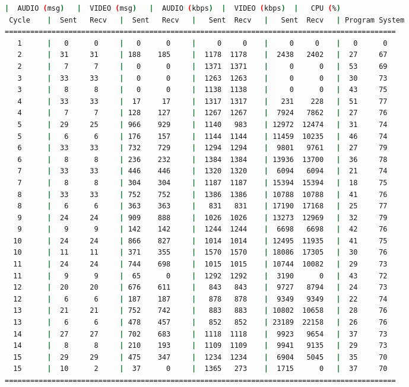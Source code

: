\begin{adjustbox}{max width=\textwidth}
\begin{lstlisting}[language=bash,basicstyle=\ttfamily\scriptsize]
          |  AUDIO (msg)   |  VIDEO (msg)   |  AUDIO (kbps)  |  VIDEO (kbps)  |   CPU (%)
 Cycle    |  Sent   Recv   |  Sent   Recv   |   Sent  Recv   |   Sent  Recv   | Program System
============================================================================================
   1      |   0      0     |   0      0     |     0     0    |     0     0    |   0      0
   2      |  31     31     | 188    185     |  1178  1178    |  2438   2402   |  27     67
   2      |   7      7     |   0      0     |  1371  1371    |     0      0   |  53     69
   3      |  33     33     |   0      0     |  1263  1263    |     0      0   |  30     73
   3      |   8      8     |   0      0     |  1138  1138    |     0      0   |  43     75
   4      |  33     33     |  17     17     |  1317  1317    |   231    228   |  51     77
   4      |   7      7     | 128    127     |  1267  1267    |  7924   7862   |  27     76
   5      |  29     25     | 966    929     |  1140   983    | 12972  12474   |  31     74
   5      |   6      6     | 176    157     |  1144  1144    | 11459  10235   |  46     74
   6      |  33     33     | 732    729     |  1294  1294    |  9801   9761   |  27     79
   6      |   8      8     | 236    232     |  1384  1384    | 13936  13700   |  36     78
   7      |  33     33     | 446    446     |  1320  1320    |  6094   6094   |  21     74
   7      |   8      8     | 304    304     |  1187  1187    | 15394  15394   |  18     75
   8      |  33     33     | 752    752     |  1386  1386    | 10788  10788   |  41     76
   8      |   6      6     | 363    363     |   831   831    | 17190  17168   |  25     77
   9      |  24     24     | 909    888     |  1026  1026    | 13273  12969   |  32     79
   9      |   9      9     | 142    142     |  1244  1244    |  6698   6698   |  42     76
  10      |  24     24     | 866    827     |  1014  1014    | 12495  11935   |  41     75
  10      |  11     11     | 371    355     |  1570  1570    | 18086  17305   |  30     76
  11      |  24     24     | 744    698     |  1015  1015    | 10744  10082   |  29     73
  11      |   9      9     |  65      0     |  1292  1292    |  3190      0   |  43     72
  12      |  20     20     | 676    611     |   843   843    |  9727   8794   |  24     73
  12      |   6      6     | 187    187     |   878   878    |  9349   9349   |  22     74
  13      |  21     21     | 752    742     |   883   883    | 10802  10658   |  28     76
  13      |   6      6     | 478    457     |   852   852    | 23189  22158   |  26     76
  14      |  27     27     | 702    683     |  1118  1118    |  9923   9654   |  37     73
  14      |   8      8     | 210    193     |  1109  1109    |  9941   9135   |  29     73
  15      |  29     29     | 475    347     |  1234  1234    |  6904   5045   |  35     70
  15      |  10      2     |  37      0     |  1365   273    |  1715      0   |  37     70
============================================================================================
\end{lstlisting}
\end{adjustbox}

